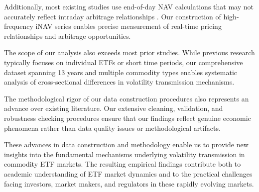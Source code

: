 Additionally, most existing studies use end-of-day NAV calculations that may not accurately reflect intraday arbitrage relationships \citep{petajisto2017inefficiencies}. Our construction of high-frequency iNAV series enables precise measurement of real-time pricing relationships and arbitrage opportunities.

The scope of our analysis also exceeds most prior studies. While previous research typically focuses on individual ETFs or short time periods, our comprehensive dataset spanning 13 years and multiple commodity types enables systematic analysis of cross-sectional differences in volatility transmission mechanisms.

The methodological rigor of our data construction procedures also represents an advance over existing literature. Our extensive cleaning, validation, and robustness checking procedures ensure that our findings reflect genuine economic phenomena rather than data quality issues or methodological artifacts.

These advances in data construction and methodology enable us to provide new insights into the fundamental mechanisms underlying volatility transmission in commodity ETF markets. The resulting empirical findings contribute both to academic understanding of ETF market dynamics and to the practical challenges facing investors, market makers, and regulators in these rapidly evolving markets.